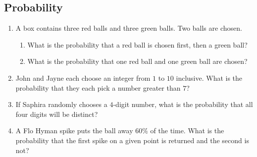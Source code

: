 \documentclass[twocolumn]{article}
\begin{document}
	\subsection*{Probability}
	\begin{enumerate}[resume]
		\item A box contains three red balls and three green balls. Two balls
			are chosen.
			\begin{enumerate}
				\item What is the probability that a red ball is chosen first,
					then a green ball?
					\vspace{3cm}
				\item What is the probability that one red ball and one green
					ball are chosen?
					\vspace{3cm}
			\end{enumerate}
		\item John and Jayne each choose an integer from $1$ to $10$ inclusive.
			What is the probability that they each pick a number greater than
			$7$?
			\vspace{3cm}
		\item If Saphira randomly chooses a $4$-digit number, what is the
			probability that all four digits will be distinct?
			\vspace{3cm}
		\item A Flo Hyman spike puts the ball away $60\%$ of the time. What is
			the probability that the first spike on a given point is returned
			and the second is not?
			\vspace{3cm}
	\end{enumerate}
\end{document}
